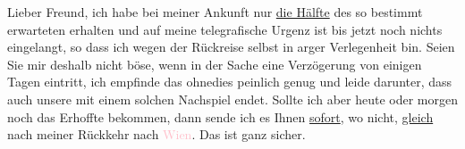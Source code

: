 \pstart
           Lieber Freund, ich habe bei meiner Ankunft nur \uline{die Hälfte} des so bestimmt erwarteten \label{K_L03164-1v}\label{K_L03164-1h} erhalten und auf meine telegrafische Urgenz ist bis jetzt
               noch nichts eingelangt, so dass ich wegen der Rückreise selbst in arger Verlegenheit
               bin. Seien Sie mir deshalb nicht böse, wenn in der Sache eine Verzögerung von einigen
               Tagen eintritt, ich empfinde das ohnedies peinlich genug und leide darunter, dass
               auch unsere \label{K_L03164-2v}\label{K_L03164-2h} mit einem solchen Nachspiel endet. Sollte ich aber heute oder morgen noch das
               Erhoffte bekommen, dann sende ich es Ihnen \uline{sofort}, wo
               nicht, \uline{gleich} nach meiner Rückkehr nach \textcolor{pink}{Wien}{}\ledrightnote{\textcolor{pink}{Wien}}. Das ist ganz sicher.\pend
           
